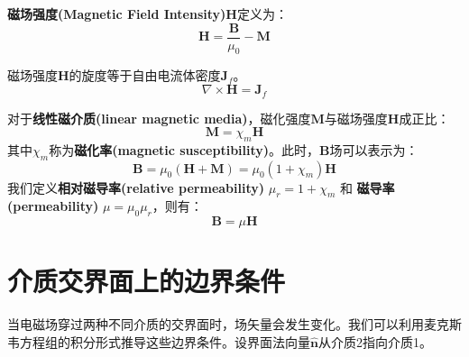 \documentclass[fontset=none]{ctexart}
\begin{document}
\begin{definition}[磁场强度]
    \textbf{磁场强度(Magnetic Field Intensity)}$\bm{H}$定义为：
    \begin{equation}
        \bm{H} = \frac{\bm{B}}{\mu_0} - \bm{M}
    \end{equation}
\end{definition}
\begin{theorem}[介质中的安培定律]
    磁场强度$\bm{H}$的旋度等于自由电流体密度$\bm{J}_f$。
    \begin{equation}
        \nabla \times \bm{H} = \bm{J}_f
    \end{equation}
\end{theorem}

对于\textbf{线性磁介质(linear magnetic media)}，磁化强度$\bm{M}$与磁场强度$\bm{H}$成正比：
\begin{equation}
    \bm{M} = \chi_m \bm{H}
\end{equation}
其中$\chi_m$称为\textbf{磁化率(magnetic susceptibility)}。此时，$\bm{B}$场可以表示为：
\begin{equation}
    \bm{B} = \mu_0 (\bm{H} + \bm{M}) = \mu_0 (1 + \chi_m) \bm{H}
\end{equation}
我们定义\textbf{相对磁导率(relative permeability)} $\mu_r = 1+\chi_m$ 和 \textbf{磁导率(permeability)} $\mu = \mu_0 \mu_r$，则有：
\begin{equation}
    \bm{B} = \mu \bm{H}
\end{equation}

\section{介质交界面上的边界条件}
当电磁场穿过两种不同介质的交界面时，场矢量会发生变化。我们可以利用麦克斯韦方程组的积分形式推导这些边界条件。设界面法向量$\hat{\bm{n}}$从介质2指向介质1。
\end{document}
